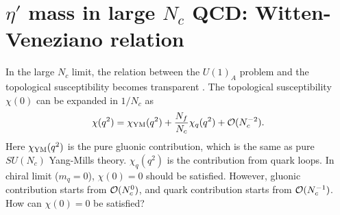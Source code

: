 \documentclass[11pt,a4paper]{article}
\begin{document}

\section{$\eta'$ mass in large $N_c$ QCD: Witten-Veneziano relation}\label{sec:etaprime large N}
In the large $N_c$ limit, the relation between the $U(1)_A$ problem and the topological susceptibility becomes transparent \cite{Witten:1979vv, Veneziano:1979ec}.
The topological susceptibility $\chi(0)$ can be expanded in $1/N_c$ as
\begin{align}
    \chi(q^2) = \chi_{\rm YM}(q^2) + \frac{N_f}{N_c} \chi_q(q^2) + {\cal O}(N_c^{-2}).
\end{align}
Here $\chi_{\rm YM}(q^2)$ is the pure gluonic contribution, which is the same as pure $SU(N_c)$ Yang-Mills theory. $\chi_q(q^2)$ is the contribution from quark loops.
In chiral limit ($m_q=0$), $\chi(0)=0$ should be satisfied. However, gluonic contribution starts from ${\cal O}(N_c^0)$, and quark contribution starts from ${\cal O}(N_c^{-1})$. How can $\chi(0)=0$ be satisfied? 
\end{document}
